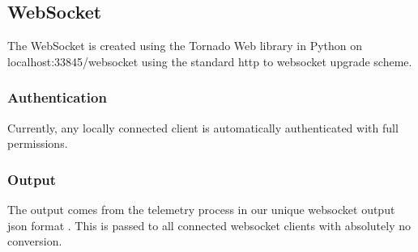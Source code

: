 \subsectionfont{\fontsize{14}{14}\selectfont}

\subsection{WebSocket}

The WebSocket is created using the Tornado Web library in Python on localhost:33845/websocket using the standard http to websocket upgrade scheme.

\subsubsection{Authentication}
Currently, any locally connected client is automatically authenticated with full permissions.

\subsubsection{Output}
The output comes from the telemetry process in our unique websocket output json format \cite{websocket_format}. This is passed to all connected websocket clients with absolutely no conversion.